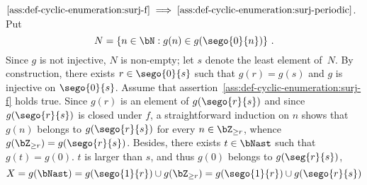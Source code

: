 


  $\ref{ass:def-cyclic-enumeration:surj-f} \implies  \ref{ass:def-cyclic-enumeration:surj-periodic}$.
   Put
   $$
   N = \left\{ n \in \bN : g(n) \in g(\sego{0}{n}) \right\} \, .
   $$
   Since $g$ is not injective, $N$ is non-empty;
   let $s$ denote the least element of~$N$.
   By construction,
   there exists $r \in \sego{0}{s}$ such that $g(r) = g(s)$ and 
   $g$ is injective on $\sego{0}{s}$.
   Assume that assertion~\ref{ass:def-cyclic-enumeration:surj-f} holds true.
   Since $g(r)$ is an element of $g(\sego{r}{s})$ and since $g(\sego{r}{s})$ is closed under $f$,
   a straightforward induction on $n$ shows that $g(n)$ belongs to $g(\sego{r}{s})$ for every $n \in \bZ_{\ge r}$,
   whence $g(\bZ_{\ge r}) = g(\sego{r}{s})$.
   Besides, there exists $t \in \bNast$ such that $g(t) = g(0)$.
    $t$ is larger than $s$, and thus $g(0)$ belongs to $g(\seg{r}{s})$, 
   $$X = g(\bNast) = g(\sego{1}{r}) \cup g(\bZ_{\ge r}) = g(\sego{1}{r}) \cup g(\sego{r}{s}) $$
  
